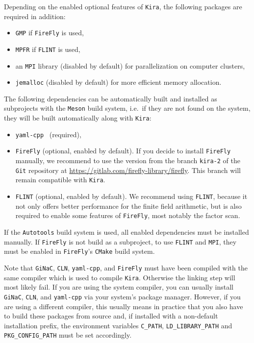 \documentclass[11pt,a4paper,DIV=11,numbers=noenddot,parskip=half]{scrartcl}
\newcommand{\code}[1]{\texttt{#1}}
\newcommand*{\kira}{\code{Kira}}
\newcommand*{\kiraZO}{\code{Kira\;2.0}}
\newcommand*{\firefly}{\code{FireFly}}
\newcommand*{\flint}{\code{FLINT}}
\begin{document}
Depending on the enabled optional features of \kira{}, the following packages
are required in addition:
%
\begin{itemize}
  \item \code{GMP} \cite{GMP} if \firefly{} is used,
  \item \code{MPFR} \cite{MPFR} if \flint{} is used,
  \item an \code{MPI} \cite{mpi_forum} library (disabled by default) for
    parallelization on computer clusters,
  \item \code{jemalloc} \cite{jemalloc} (disabled by default) for more efficient
    memory allocation.
\end{itemize}
%
The following dependencies can be automatically built and installed as
subprojects with the \code{Meson} build system, i.e.\ if they are not found on
the system, they will be built automatically along with \kira{}: %
\begin{itemize}
  \item \code{yaml-cpp}~\cite{YAMLCPP} (required),
  \item \firefly{} \cite{Klappert:2020aqs} (optional, enabled by default).
    If you decide to install \firefly{} manually, we recommend to use the
    version from the branch \code{kira-2} of the \code{Git} repository at
    \url{https://gitlab.com/firefly-library/firefly}.
    This branch will remain compatible with \kiraZO{}.
  \item \flint{} \cite{flint} (optional, enabled by default).
    We recommend using \flint{}, because it not only offers better performance
    for the finite field arithmetic, but is also required to enable some
    features of \code{FireFly}, most notably the factor scan.
\end{itemize}
%
If the \code{Autotools} build system is used, all enabled dependencies must be
installed manually.
If \code{FireFly} is not build as a subproject, to use \flint{} and \code{MPI},
they must be enabled in \code{FireFly}'s \code{CMake} build system.

Note that \code{GiNaC}, \code{CLN}, \code{yaml-cpp}, and \firefly{}
must have been compiled with the same compiler which is used to compile \kira{}.
Otherwise the linking step will most likely fail.
If you are using the system compiler, you can usually install \code{GiNaC},
\code{CLN}, and \code{yaml-cpp} via your system's package manager.
However, if you are using a different compiler, this usually means in practice
that you also have to build these packages from source and, if installed
with a non-default installation prefix, the environment variables
\code{C\_PATH}, \code{LD\_LIBRARY\_PATH} and \code{PKG\_CONFIG\_PATH}
must be set accordingly.
\end{document}
